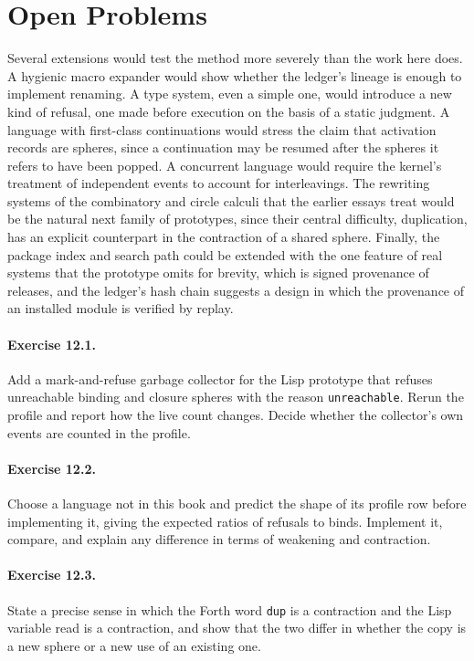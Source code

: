 \documentclass[11pt,oneside]{report}
\theoremstyle{plain}
\theoremstyle{definition}
\theoremstyle{remark}
\begin{document}
\section{Open Problems}

Several extensions would test the method more severely than the work here does. A hygienic macro expander would show whether the ledger's lineage is enough to implement renaming. A type system, even a simple one, would introduce a new kind of refusal, one made before execution on the basis of a static judgment. A language with first-class continuations would stress the claim that activation records are spheres, since a continuation may be resumed after the spheres it refers to have been popped. A concurrent language would require the kernel's treatment of independent events to account for interleavings. The rewriting systems of the combinatory and circle calculi that the earlier essays treat would be the natural next family of prototypes, since their central difficulty, duplication, has an explicit counterpart in the contraction of a shared sphere. Finally, the package index and search path could be extended with the one feature of real systems that the prototype omits for brevity, which is signed provenance of releases, and the ledger's hash chain suggests a design in which the provenance of an installed module is verified by replay.

\paragraph{Exercise 12.1.} Add a mark-and-refuse garbage collector for the Lisp prototype that refuses unreachable binding and closure spheres with the reason \texttt{unreachable}. Rerun the profile and report how the live count changes. Decide whether the collector's own events are counted in the profile.

\paragraph{Exercise 12.2.} Choose a language not in this book and predict the shape of its profile row before implementing it, giving the expected ratios of refusals to binds. Implement it, compare, and explain any difference in terms of weakening and contraction.

\paragraph{Exercise 12.3.} State a precise sense in which the Forth word \texttt{dup} is a contraction and the Lisp variable read is a contraction, and show that the two differ in whether the copy is a new sphere or a new use of an existing one.
\appendix
\end{document}
